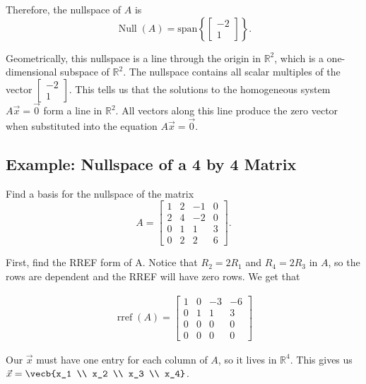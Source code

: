 Therefore, the nullspace of $A$ is
\[
\operatorname{Null}(A) = \text{span}\left\{
\begin{bmatrix}
-2 \\ 1
\end{bmatrix}
\right\}.
\]

Geometrically, this nullspace is a line through the origin in $\mathbb{R}^2$, which is a one-dimensional subspace of $\mathbb{R}^2$. The nullspace contains all scalar multiples of the vector $\begin{bmatrix}-2 \\ 1\end{bmatrix}$. This tells us that the solutions to the homogeneous system $A\vec{x}=\vec{0}$ form a line in $\mathbb{R}^2$. All vectors along this line produce the zero vector when substituted into the equation $A\vec{x}=\vec{0}$.

\subsection{Example: Nullspace of a 4 by 4 Matrix}

Find a basis for the nullspace of the matrix
\[
A=\begin{bmatrix}
1 & 2 & -1 & 0\\
2 & 4 & -2 & 0\\
0 & 1 & 1 & 3\\
0 & 2 & 2 & 6
\end{bmatrix}.
\]

First, find the RREF form of A. Notice that $R_2=2R_1$ and $R_4=2R_3$ in $A$, so the rows are dependent and the RREF will have zero rows. We get that

$$\begin{array}{c} \operatorname{rref}(A)=
\begin{bmatrix}
1 & 0 & -3 & -6\\
0 & 1 & 1 & 3\\
0 & 0 & 0 & 0\\
0 & 0 & 0 & 0
\end{bmatrix} \end{array}$$

Our $\vec{x}$ must have one entry for each column of $A$, so it lives in $\mathbb{R}^4$. This gives us $\vec{x} = \vecb{x_1 \\ x_2 \\ x_3 \\ x_4}$. 

